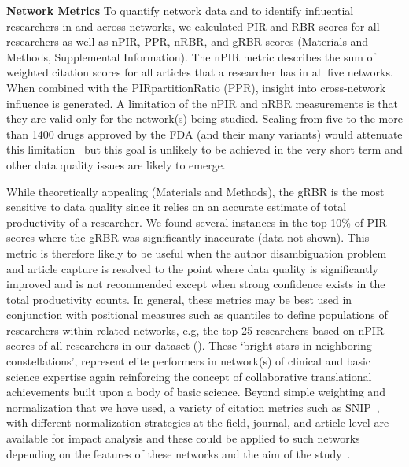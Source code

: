 \documentclass[10pt,letterpaper]{article}
\begin{document}
\textbf{Network Metrics} To quantify network data and to identify influential researchers in and across networks, we calculated PIR and RBR scores for all researchers as well as nPIR, PPR, nRBR, and gRBR scores (Materials and Methods, Supplemental Information). The nPIR metric describes the sum of weighted citation scores for all articles that a researcher has in all five networks. When combined with the PIRpartitionRatio (PPR), insight into cross-network influence is generated.  A limitation of the nPIR and nRBR measurements is that they are valid only for the network(s) being studied. Scaling from five to the more than 1400 drugs approved by the FDA (and their many variants) would attenuate this limitation~\cite{bibKinch} but this goal is unlikely to be achieved in the very short term and other data quality issues are likely to emerge. 

While theoretically appealing (Materials and Methods), the gRBR is the most sensitive to data quality since it relies on an accurate estimate of total productivity of a researcher. We found several instances in the top 10\% of PIR scores where the gRBR was significantly inaccurate (data not shown). This metric is therefore likely to be useful when the author disambiguation problem and article capture is resolved to the point where data quality is significantly improved and is not recommended except when strong confidence exists in the total productivity counts. In general, these metrics may be best used in conjunction with positional measures such as quantiles to define populations of researchers within related networks, e.g, the top 25 researchers based on nPIR scores of all researchers in our dataset (). These `bright stars in neighboring constellations', represent elite performers in network(s) of clinical and basic science expertise again reinforcing the concept of collaborative translational achievements built upon a body of basic science. Beyond simple weighting and normalization that we have used, a variety of citation metrics such as SNIP~\cite{bibWaltman}, with different normalization strategies at the field, journal, and article level are available for impact analysis and these could be applied to such networks depending on the features of these networks and the aim of the study~\cite{bibIoannidis}. 
\end{document}

